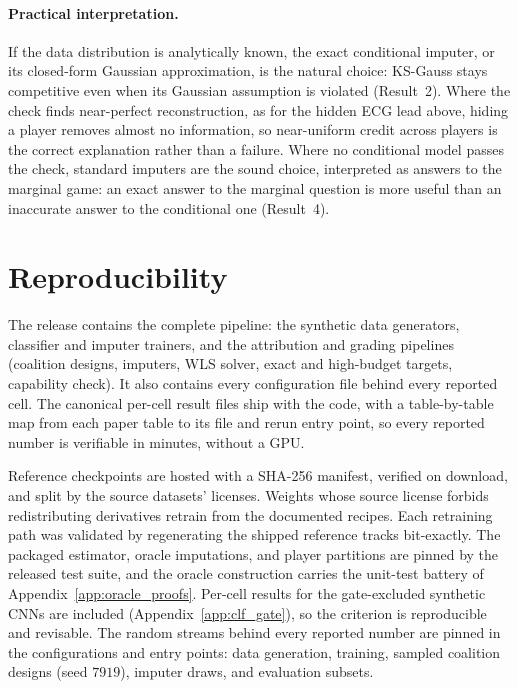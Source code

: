 \paragraph{Practical interpretation.}
If the data distribution is analytically known, the exact conditional
imputer, or its closed-form Gaussian approximation, is the natural choice:
KS-Gauss stays competitive even when its Gaussian assumption is violated
(Result~2).  Where the check finds near-perfect reconstruction, as for the
hidden ECG lead above, hiding a player removes almost no information, so
near-uniform credit across players is the correct explanation rather than
a failure.  Where no conditional model passes the check, standard imputers
are the sound choice, interpreted as answers to the marginal game: an
exact answer to the marginal question is more useful than an inaccurate
answer to the conditional one (Result~4).

\section{Reproducibility}
\label{app:repro}

The release contains the complete pipeline: the synthetic data generators,
classifier and imputer trainers, and the attribution and grading pipelines
(coalition designs, imputers, WLS solver, exact and high-budget targets,
capability check).  It also contains every configuration file behind every
reported cell.  The canonical per-cell result files ship with the code,
with a table-by-table map from each paper table to its file and rerun entry
point, so every reported number is verifiable in minutes, without a GPU.

Reference checkpoints are hosted with a SHA-256 manifest, verified on
download, and split by the source datasets' licenses.  Weights whose source
license forbids redistributing derivatives retrain from the documented
recipes.  Each retraining path was validated by regenerating the shipped
reference tracks bit-exactly.  The packaged estimator, oracle imputations, and
player partitions are pinned by the released test suite, and the oracle
construction carries the unit-test battery of
Appendix~\ref{app:oracle_proofs}.  Per-cell results for the gate-excluded
synthetic CNNs are included (Appendix~\ref{app:clf_gate}), so the criterion is
reproducible and revisable.  The random streams behind every reported
number are pinned in the configurations and entry points: data generation,
training, sampled coalition designs (seed $7919$), imputer draws, and
evaluation subsets.

